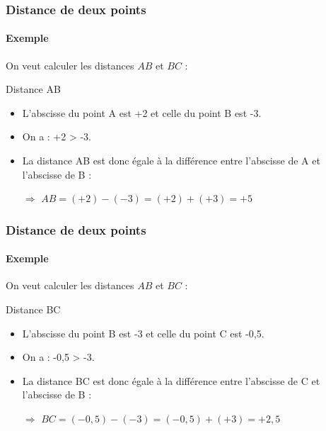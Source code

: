 \documentclass{beamer}
\begin{document}
\begin{frame}
	\frametitle{Distance de deux points}  
	\framesubtitle{Exemple}	
	
	On veut calculer les distances $AB$ et $BC$ :
	\pause

	\begin{exampleblock}{Distance AB}
				
		\begin{itemize}
			\item L'abscisse du point A est +2 et celle du point B est -3.
			\item On a : +2 > -3.
			\item La distance AB est donc égale à la différence entre l'abscisse de A et l'abscisse de B :
			\item[$\Rightarrow $] $AB = (+2) - (-3) = (+2) + (+3) = +5$
		\end{itemize}
	\end{exampleblock}
		
\end{frame}

\begin{frame}
	\frametitle{Distance de deux points}  
	\framesubtitle{Exemple}	
	
	On veut calculer les distances $AB$ et $BC$ :
	

	\begin{exampleblock}{Distance BC}
		
		\begin{itemize}
			\item L'abscisse du point B est -3 et celle du point C est -0,5.
			\item On a : -0,5 > -3.
			\item La distance BC est donc égale à la différence entre l'abscisse de C et l'abscisse de B :
			\item[$\Rightarrow $] $BC = (-0,5) - (-3) = (-0,5) + (+3) = +2,5$
		\end{itemize}
	\end{exampleblock}
\end{frame}
\end{document}
